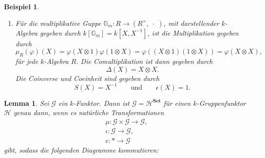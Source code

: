 \documentclass[a4paper, 11pt]{scrartcl}
\newcommand{\id}{\text{id}}
\theoremstyle{basicstyle}
\newtheorem{beispiel}[definition]{Beispiel}
\newtheorem{lemma}[definition]{Lemma}
\begin{document}
\begin{beispiel}
\begin{enumerate}
            \item Für die multiplikative Guppe \(\mathbb{G}_m : R \to (R^\times, \;\cdot\;)\), mit darstellender \(k\)-Algebra gegeben durch \(k[\mathbb{G}_m] = k[X, X^{-1}]\), ist die Multiplikation gegeben durch
                \[\mu_R(\varphi)(X) = \varphi(X \otimes 1)\varphi(1 \otimes X) = \varphi((X \otimes 1)(1 \otimes X)) = \varphi(X \otimes X),\]
                für jede \(k\)-Algebra \(R\).
                Die Comultiplikation ist dann gegeben durch 
                \[\Delta (X) = X \otimes X.\]
                Die Coinverse und Coeinheit sind gegeben durch
                \[S(X) = X^{-1} \qquad\text{und}\qquad \epsilon(X) = 1.\]
        \end{enumerate}
    \end{beispiel}

    \begin{lemma}\label{lem:1}
        Sei \(\mathcal{G}\) ein \(k\)-Funktor.
        Dann ist \(\mathcal{G} = \mathcal{H}^{\textbf{Set}}\) für einen \(k\)-Gruppenfunktor \(\mathcal{H}\) genau dann, wenn es natürliche Transformationen
        \begin{gather*}
            \mu: \mathcal{G} \times \mathcal{G} \longrightarrow \mathcal{G}, \\
            \iota: \mathcal{G} \longrightarrow \mathcal{G}, \\
            e: \ast \longrightarrow \mathcal{G}
        \end{gather*}
        gibt, sodass die folgenden Diagramme kommutieren:
        \begin{figure*}[ht!]
            \centering
        \end{figure*}
        \begin{figure*}[ht!]
            \centering
            \hspace*{4em}

\end{figure*}
\end{lemma}
\end{document}
